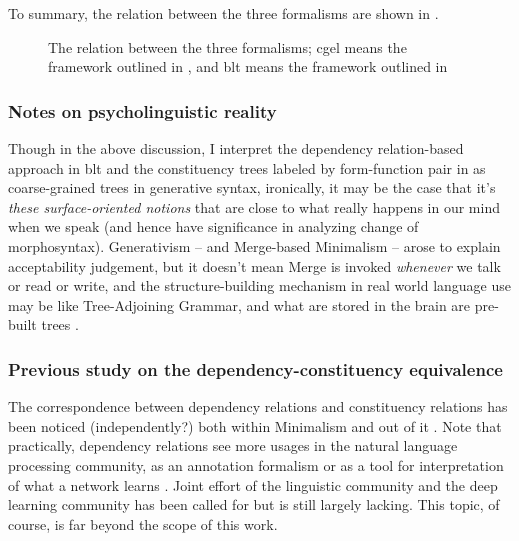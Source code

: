 \documentclass[UTF8, a4paper, oneside, scheme=plain]{ctexrep}
\begin{document}
To summary, the relation between the three formalisms are shown in .

\begin{figure}[H]
    \centering
    
    \caption{The relation between the three formalisms;
    \acs{cgel} means the framework outlined in \citet{cgel},
    and \acs{blt} means the framework outlined in \citet{dixon2009basic1}}
    \label{fig:three-formalisms}
\end{figure}

\subsubsection{Notes on psycholinguistic reality}\label{sec:psycho-real}

Though in the above discussion, 
I interpret the dependency relation-based approach in \acs{blt} 
and the constituency trees labeled by form-function pair in \citet{cgel}
as coarse-grained trees in generative syntax,
ironically, it may be the case that 
it's \emph{these surface-oriented notions} that 
are close to what really happens in our mind 
when we speak
(and hence have significance in analyzing change of morphosyntax).
Generativism -- and Merge-based Minimalism -- arose to explain acceptability judgement,
but it doesn't mean Merge is invoked \emph{whenever} we talk or read or write,
and the structure-building mechanism in real world language use 
may be like Tree-Adjoining Grammar,
and what are stored in the brain 
are pre-built trees
\citep{brain-syntax-1,brain-syntax-2}.

\subsubsection{Previous study on the dependency-constituency equivalence}

The correspondence between dependency relations and constituency relations 
has been noticed (independently?) 
both within Minimalism
\citep{schneider1998linguistic,osborne2011bare,kobele2021minimalist}
and out of it \citep{kahane2015syntactic}. %
Note that practically, dependency relations see more usages in 
the natural language processing community,
as an annotation formalism or as a tool 
for interpretation of what a network learns \citep{chi2020finding}.
Joint effort of the linguistic community and the deep learning community
has been called for \citep{pater2019generative} 
but is still largely lacking.
This topic, of course, is far beyond the scope of this work.
\end{document}

